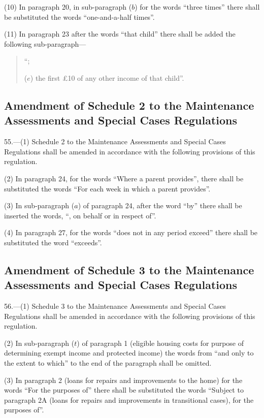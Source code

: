 \documentclass[12pt,a4paper]{article}
\begin{document}
(10) In paragraph 20, in sub-paragraph ($b$) for the words “three times” there shall be substituted the words “one-and-a-half times”.

(11) In paragraph 23 after the words “that child” there shall be added the following sub-paragraph—
\begin{quotation}
“;

($e$) the first £10 of any other income of that child”.
\end{quotation}

\subsection[55.Amendment of Schedule 2 to the Maintenance Assessments and Special Cases Regulations]{Amendment of Schedule 2 to the Maintenance Assessments and Special Cases Regulations}

55.—(1) Schedule 2 to the Maintenance Assessments and Special Cases Regulations shall be amended in accordance with the following provisions of this regulation.

(2) In paragraph 24, for the words “Where a parent provides”, there shall be substituted the words “For each week in which a parent provides”.

(3) In sub-paragraph ($a$) of paragraph 24, after the word “by” there shall be inserted the words, “, on behalf or in respect of”.

(4) In paragraph 27, for the words “does not in any period exceed” there shall be substituted the word “exceeds”.

\subsection[56. Amendment of Schedule 3 to the Maintenance Assessments and Special Cases Regulations]{Amendment of Schedule 3 to the Maintenance Assessments and Special Cases Regulations}

56.—(1) Schedule 3 to the Maintenance Assessments and Special Cases Regulations shall be amended in accordance with the following provisions of this regulation.

(2) In sub-paragraph ($t$) of paragraph 1 (eligible housing costs for purpose of determining exempt income and protected income) the words from “and only to the extent to which” to the end of the paragraph shall be omitted.

(3) In paragraph 2 (loans for repairs and improvements to the home) for the words “For the purposes of” there shall be substituted the words “Subject to paragraph 2A (loans for repairs and improvements in transitional cases), for the purposes of”.
\end{document}
